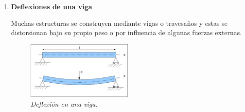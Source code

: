 \documentclass[11pt]{article}
\begin{document}
\begin{enumerate}
La altura del paracaidista, en funci\'on del tiempo, $y(t)[m]$ se modela por el P.V.I.
$$
\begin{array}{rl|}
y'' 	& = -g+\frac{1}{m}\alpha(t) \\
y(0)	& = 600\\
y'(0)	& 0\\ \hline
\end{array}
$$
donde $g=9.81[m/s^2]$ es la aceleraci\'on de gravedad, $m=80[kg]$ es la masa del paracaidista y $\alpha(t)$ es la resistencia del aire, la cual es proporcional al cuadrado de la velocidad del paracaidista, pero esta cambia cuando el paracaida se abre seg\'un
$$
\alpha(t)=
\begin{cases}
K_1\, y'(t)^2 , \quad \text{si} \quad t<5[s]\\
K_2\, y'(t)^2 , \quad \text{si} \quad t\geq 5[s]
\end{cases}.
$$
\begin{enumerate}
\item Calcule la soluci\'on anal\'itica en caida libre del paracaidista $(K_1=K_2=0)$. ¿Cuanto tiempo se demora el paracaidista en llegar a tierra?, ¿Cual es la velocidad del impacto?. Grafique la altura versus el tiempo.
\item Resuelva num\'ericamente considerando 
$$
K_1=1/15, \quad K_2=4/15.
$$
¿A qu\'e altura se abre el paracaida?, ¿Cuanto se demora en llegar al suelo?, ¿Cuál es la velocidad del impacto?. Grafique la altura versus el tiempo.
\end{enumerate}

\newpage
\item \textbf{Deflexiones de una viga}

Muchas estructuras se construyen mediante vigas o travesa\~{n}os y estas se distorsionan bajo su propio peso o por influencia de algunas fuerzas externas. 
     \begin{figure}[htp]
      \begin{center}
\includegraphics[width=0.5\textwidth]{./viga.png}
      \caption{\sl Deflexi\'on en una viga.}
      \end{center}
      \end{figure}
      

\end{enumerate}
\end{document}
